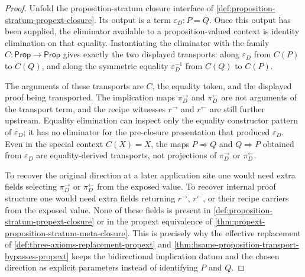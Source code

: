 \begin{proof}
Unfold the proposition-stratum closure interface of \autoref{def:proposition-stratum-propext-closure}. Its output is a term $\varepsilon_D:P=Q$. Once this output has been supplied, the eliminator available to a proposition-valued context is identity elimination on that equality. Instantiating the eliminator with the family $C:\mathsf{Prop}\to\mathsf{Prop}$ gives exactly the two displayed transports: along $\varepsilon_D$ from $C(P)$ to $C(Q)$, and along the symmetric equality $\varepsilon_D^{-1}$ from $C(Q)$ to $C(P)$.

The arguments of these transports are $C$, the equality token, and the displayed proof being transported. The implication maps $\pi^{\rightarrow}_D$ and $\pi^{\leftarrow}_D$ are not arguments of the transport term, and the recipe witnesses $r^{\rightarrow}$ and $r^{\leftarrow}$ are still further upstream. Equality elimination can inspect only the equality constructor pattern of $\varepsilon_D$; it has no eliminator for the pre-closure presentation that produced $\varepsilon_D$. Even in the special context $C(X)=X$, the maps $P\Rightarrow Q$ and $Q\Rightarrow P$ obtained from $\varepsilon_D$ are equality-derived transports, not projections of $\pi^{\rightarrow}_D$ or $\pi^{\leftarrow}_D$.

To recover the original direction at a later application site one would need extra fields selecting $\pi^{\rightarrow}_D$ or $\pi^{\leftarrow}_D$ from the exposed value. To recover internal proof structure one would need extra fields returning $r^{\rightarrow}$, $r^{\leftarrow}$, or their recipe carriers from the exposed value. None of these fields is present in \autoref{def:proposition-stratum-propext-closure} or in the propext equivalence of \autoref{thm:propext-proposition-stratum-meta-closure}. This is precisely why the effective replacement of \autoref{def:three-axioms-replacement-propext} and \autoref{thm:hsame-proposition-transport-bypasses-propext} keeps the bidirectional implication datum and the chosen direction as explicit parameters instead of identifying $P$ and $Q$.
\end{proof}
